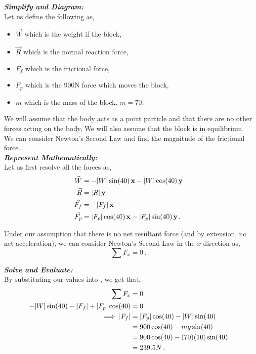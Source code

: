 \begin{subquestions}
\begin{subsubquestions}

\subsubquestion

\textbf{\textit{Simplify and Diagram:}} \\
Let us define the following as,
\begin{itemize}
	\item $\vec{W}$ which is the weight if the block,
	\item $\vec{R}$ which is the normal reaction force,
	\item $F_f$ which is the frictional force,
	\item $F_{p}$ which is the 900N force which moves the block,
	\item $m$ which is the mass of the block, $m=70$.
\end{itemize}
We will assume that the body acts as a point particle and that there are no other forces acting on the body, We will also assume that the block is in equilibrium. We can consider Newton's Second Law and find the magnitude of the frictional force.\\




\textbf{\textit{Represent Mathematically:}} \\
Let us first resolve all the forces as,
\begin{align}
	\vec{W} & = -|W|\sin(40)\,\mathbf{x} - |W|\cos(40)\,\mathbf{y}  \\ 
	\vec{R} & = |R|\,\mathbf{y}  \\ 
	\vec{F_f} & = -|F_f|\,\mathbf{x}  \\
	\vec{F_p} & = |F_p|\cos(40) \,\mathbf{x} -|F_p|\sin(40) \,\mathbf{y} \,.
\end{align}

Under our assumption that there is no net resultant force (and by extension, no net acceleration), we can consider Newton's Second Law in the $x$ direction as,
\begin{equation}
	\sum F_x = 0 \,. \label{2011:q6:Newt1}
\end{equation}




\textbf{\textit{Solve and Evaluate:}} \\
By substituting our values into , we get that,
\begin{align}
	\sum F_x & = 0 \nonumber \\
	-|W|\sin(40)-|F_f|+|F_p|\cos(40) & = 0 \nonumber \\
	\implies |F_f| & = |F_p|\cos(40)-|W|\sin(40) \nonumber \\
	               & = 900\cos(40)-mg\sin(40) \nonumber \\
	               & = 900\cos(40)-(70)(10)\sin(40) \nonumber \\
	               & = 239.5N \,.
\end{align}

\end{subsubquestions}
	
	
	
	
\end{subquestions}
